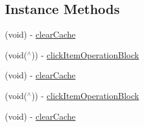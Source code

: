 \subsection*{Instance Methods}
\begin{DoxyCompactItemize}
\item 
(void) -\/ \mbox{\hyperlink{interface_s_d_cycle_scroll_view_ad0b8cc314d8c7faa9b3ec3cf25bff771}{clear\+Cache}}
\item 
(void($^\wedge$)) -\/ \mbox{\hyperlink{interface_s_d_cycle_scroll_view_a3e4bc3d04fbe3fcd562eefd090e0a571}{click\+Item\+Operation\+Block}}
\item 
(void) -\/ \mbox{\hyperlink{interface_s_d_cycle_scroll_view_ad0b8cc314d8c7faa9b3ec3cf25bff771}{clear\+Cache}}
\item 
(void($^\wedge$)) -\/ \mbox{\hyperlink{interface_s_d_cycle_scroll_view_a3e4bc3d04fbe3fcd562eefd090e0a571}{click\+Item\+Operation\+Block}}
\item 
(void) -\/ \mbox{\hyperlink{interface_s_d_cycle_scroll_view_ad0b8cc314d8c7faa9b3ec3cf25bff771}{clear\+Cache}}
\end{DoxyCompactItemize}
